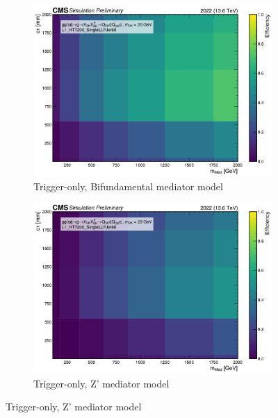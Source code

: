 \begin{figure}[h]
  \centering

  \begin{subfigure}[t]{0.45\textwidth}
    \centering
    \includegraphics[width=\linewidth]{images/L1/llp_2D_tchan/trigeffplots2D_L1_efftype-trig_t-channel_mDark-20_L1_HTT200_SingleLLPJet60_study_cloppear.pdf}
    \caption{Trigger-only, Bifundamental mediator model}
    \label{fig:htt200singlellpjet60_trig_tchan}
  \end{subfigure}
  \hfill
  \begin{subfigure}[t]{0.45\textwidth}
    \centering
    \includegraphics[width=\linewidth]{images/L1/llp_2D_schan/trigeffplots2D_L1_efftype-trig_s-channel_mDark-20_L1_HTT200_SingleLLPJet60_study_cloppear.pdf}
    \caption{Trigger-only, Z' mediator model}
    \label{fig:htt200singlellpjet60_trig_schan}
  \end{subfigure}


\end{figure}
